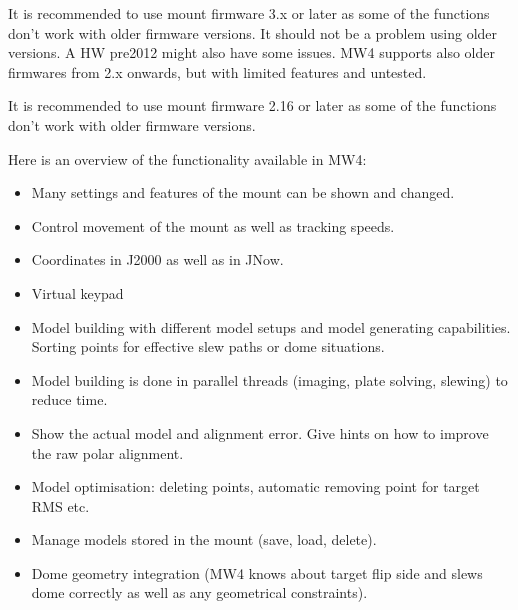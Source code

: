 \documentclass[a4paper,10pt,english]{sphinxmanual}
\begin{document}
\sphinxAtStartPar
It is recommended to use mount firmware 3.x or later as some of the functions
don’t work with older firmware versions. It should not be a problem using older
versions. A HW pre2012 might also have some issues. MW4 supports also older
firmwares from 2.x onwards, but with limited features and untested.


\sphinxAtStartPar
It is recommended to use mount firmware 2.16 or later as some of the functions
don’t work with older firmware versions.

\sphinxAtStartPar
Here is an overview of the functionality available in MW4:
\begin{itemize}
\item {} 
\sphinxAtStartPar
Many settings and features of the mount can be shown and changed.

\item {} 
\sphinxAtStartPar
Control movement of the mount as well as tracking speeds.

\item {} 
\sphinxAtStartPar
Coordinates in J2000 as well as in JNow.

\item {} 
\sphinxAtStartPar
Virtual keypad

\item {} 
\sphinxAtStartPar
Model building with different model setups and model generating capabilities.
Sorting points for effective slew paths or dome situations.

\item {} 
\sphinxAtStartPar
Model building is done in parallel threads (imaging, plate solving, slewing)
to reduce time.

\item {} 
\sphinxAtStartPar
Show the actual model and alignment error. Give hints on how to improve the
raw polar alignment.

\item {} 
\sphinxAtStartPar
Model optimisation: deleting points, automatic removing point for target RMS etc.

\item {} 
\sphinxAtStartPar
Manage models stored in the mount (save, load, delete).

\item {} 
\sphinxAtStartPar
Dome geometry integration (MW4 knows about target flip side and slews dome
correctly as well as any geometrical constraints).


\end{itemize}
\end{document}
